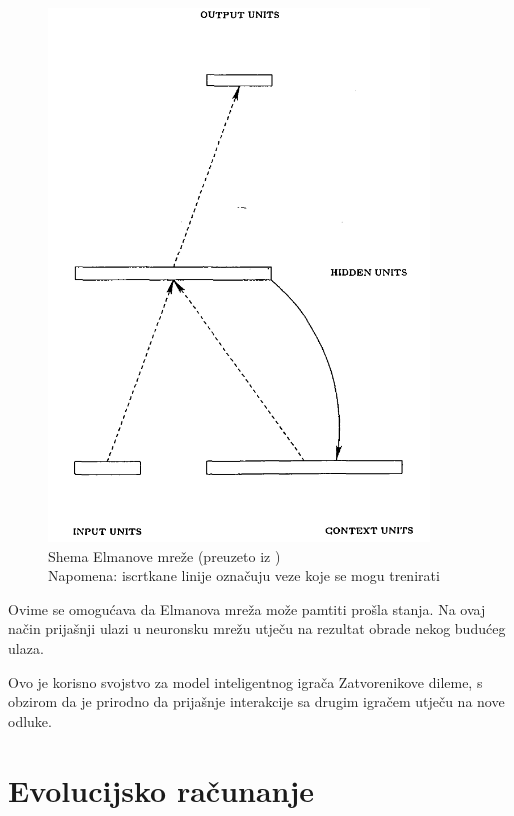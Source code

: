 \documentclass[zavrsnirad]{fer}
\begin{document}
		\begin{figure}[htb]
			\centering
			\includegraphics[width=0.9\textwidth]{Extra/ElmanovaMreza.png} 
			\caption{Shema Elmanove mreže (preuzeto iz \cite{Elman}) \\
					 Napomena: iscrtkane linije označuju veze koje se mogu trenirati}
			\label{ElmanovaMreza}
		\end{figure}
		
		Ovime se omogućava da Elmanova mreža može pamtiti prošla stanja. Na ovaj način prijašnji ulazi u neuronsku mrežu utječu na rezultat obrade nekog budućeg ulaza.
		
		Ovo je korisno svojstvo za model inteligentnog igrača Zatvorenikove dileme, s obzirom da je prirodno da prijašnje interakcije sa drugim igračem utječu na nove odluke.
	
\chapter{Evolucijsko računanje}
\label{pog:EvolucijskoRacunanje}
\end{document}
